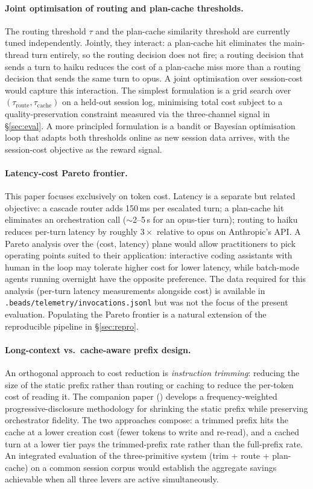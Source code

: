 \paragraph{Joint optimisation of routing and plan-cache thresholds.}
The routing threshold $\tau$ and the plan-cache similarity threshold are currently tuned independently. Jointly, they interact: a plan-cache hit eliminates the main-thread turn entirely, so the routing decision does not fire; a routing decision that sends a turn to haiku reduces the cost of a plan-cache miss more than a routing decision that sends the same turn to opus. A joint optimisation over session-cost would capture this interaction. The simplest formulation is a grid search over $(\tau_\text{route}, \tau_\text{cache})$ on a held-out session log, minimising total cost subject to a quality-preservation constraint measured via the three-channel signal in §\ref{sec:eval}. A more principled formulation is a bandit or Bayesian optimisation loop that adapts both thresholds online as new session data arrives, with the session-cost objective as the reward signal.

\paragraph{Latency-cost Pareto frontier.}
This paper focuses exclusively on token cost. Latency is a separate but related objective: a cascade router adds 150\,ms per escalated turn; a plan-cache hit eliminates an orchestration call (\(\sim\)2--5\,s for an opus-tier turn); routing to haiku reduces per-turn latency by roughly \(3\times\) relative to opus on Anthropic's API. A Pareto analysis over the (cost, latency) plane would allow practitioners to pick operating points suited to their application: interactive coding assistants with human in the loop may tolerate higher cost for lower latency, while batch-mode agents running overnight have the opposite preference. The data required for this analysis (per-turn latency measurements alongside cost) is available in \texttt{.beads/telemetry/invocations.jsonl} but was not the focus of the present evaluation. Populating the Pareto frontier is a natural extension of the reproducible pipeline in §\ref{sec:repro}.

\paragraph{Long-context vs.\ cache-aware prefix design.}
An orthogonal approach to cost reduction is \emph{instruction trimming}: reducing the size of the static prefix rather than routing or caching to reduce the per-token cost of reading it. The companion paper (\cite{trimpaper}) develops a frequency-weighted progressive-disclosure methodology for shrinking the static prefix while preserving orchestrator fidelity. The two approaches compose: a trimmed prefix hits the cache at a lower creation cost (fewer tokens to write and re-read), and a cached turn at a lower tier pays the trimmed-prefix rate rather than the full-prefix rate. An integrated evaluation of the three-primitive system (trim + route + plan-cache) on a common session corpus would establish the aggregate savings achievable when all three levers are active simultaneously.
